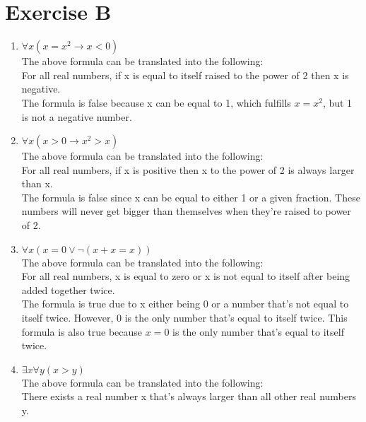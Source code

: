 \section{Exercise B} 

\renewcommand{\labelenumi}{\arabic{enumi}.}
\begin{enumerate}
\item $\forall x(x = x^2 \to x<0)$ \\
The above formula can be translated into the following: \\
For all real numbers, if x is equal to itself raised to the power of 2 then x is negative. \\

The formula is false because x can be equal to 1, which fulfills $x = x^2$, but 1 is not a negative number.\\

\item $\forall x(x > 0 \to x^2 > x)$ \\
The above formula can be translated into the following: \\
For all real numbers, if x is positive then x to the power of 2 is always larger than x. \\

The formula is false since x can be equal to either 1 or a given fraction. These numbers will never get bigger than themselves when they're raised to power of 2.\\

\item $\forall x(x = 0 \lor \neg (x + x = x))$ \\
The above formula can be translated into the following: \\
For all real numbers, x is equal to zero or x is not equal to itself after being added together twice.  \\

The formula is true due to x either being 0 or a number that's not equal to itself twice. However, 0 is the only number that's equal to itself twice. This formula is also true because $x = 0$ is the only number that's equal to itself twice.\\

\item $\exists x \forall y(x>y)$ \\
The above formula can be translated into the following: \\
There exists a real number x that's always larger than all other real numbers y. \\


\end{enumerate}
